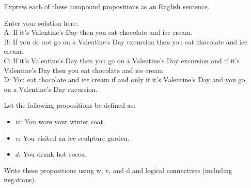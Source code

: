 \documentclass[10pt]{exam}
\begin{document}
\begin{questions}
Express each of these compound propositions as an English sentence.


\begin{solution}
    Enter your solution here:
    \\A: If it's Valentine's Day then you eat chocolate and ice cream. 
    \vspace{.1cm}
    \\B: If you do not go on a Valentine's Day excursion then you eat chocolate and ice cream.
    \vspace{.1cm}
    \\C: If it's Valentine's Day then you go on a Valentine's Day excursion and if it's Valentine's Day then you eat chocolate and ice cream.
    \vspace{.1cm}
    \\D: You eat chocolate and ice cream if and only if it's Valentine's Day and you go on a Valentine's Day excursion.
\end{solution}

\question[6] Let the following propositions be defined as:
\begin{itemize}
  \item $w$: You wore your winter coat.
  \item $v$: You visited an ice sculpture garden.
  \item $d$: You drank hot cocoa.
\end{itemize}

Write these propositions using w, v, and d and logical connectives (including negations).
\end{questions}
\end{document}
